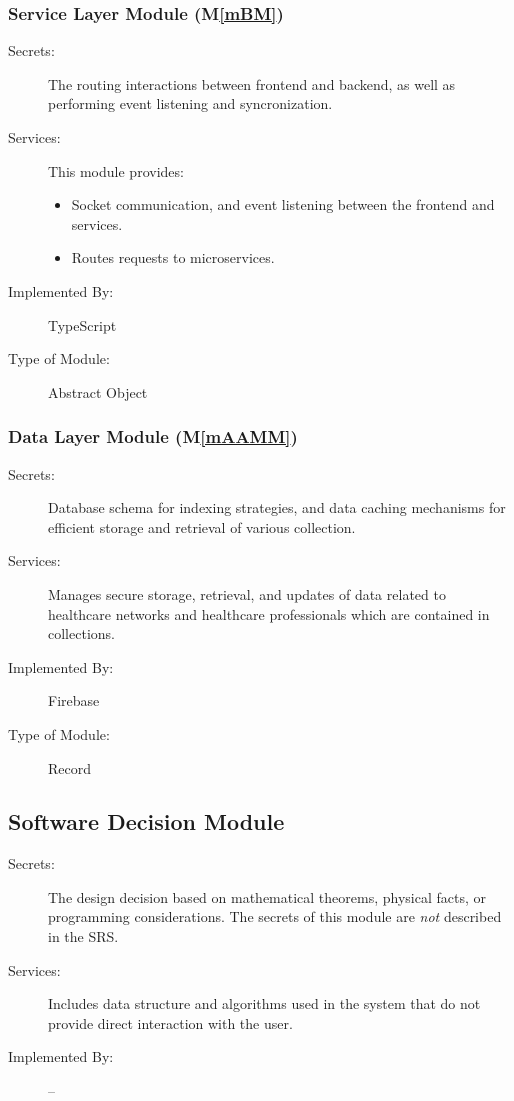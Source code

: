 \documentclass[12pt, titlepage]{article}
\newcommand{\mref}[1]{M\ref{#1}}
\begin{document}
\subsubsection{Service Layer Module (\mref{mBM})}

\begin{description}
\item[Secrets:]The routing interactions between frontend and backend, as well as performing event listening and syncronization.
\item[Services:]This module provides:
\begin{itemize}
    \item Socket communication, and event listening between the frontend and services.
    \item Routes requests to microservices.
\end{itemize}
\item[Implemented By:]TypeScript
\item[Type of Module:]Abstract Object
\end{description}

\subsubsection{Data Layer Module (\mref{mAAMM})}

\begin{description}
\item[Secrets:]Database schema for indexing strategies, and data caching mechanisms for efficient storage and retrieval of various collection.
\item[Services:]Manages secure storage, retrieval, and updates of data related to healthcare networks and healthcare professionals which are contained in collections.
\item[Implemented By:] Firebase
\item[Type of Module:] Record
\end{description}


\subsection{Software Decision Module}

\begin{description}
\item[Secrets:]The design decision based on mathematical theorems, physical facts, or programming considerations. The secrets of this module are
  \emph{not} described in the SRS.
\item[Services:]Includes data structure and algorithms used in the system that do not provide direct interaction with the user. 
\item[Implemented By:] --
\end{description}
\end{document}
